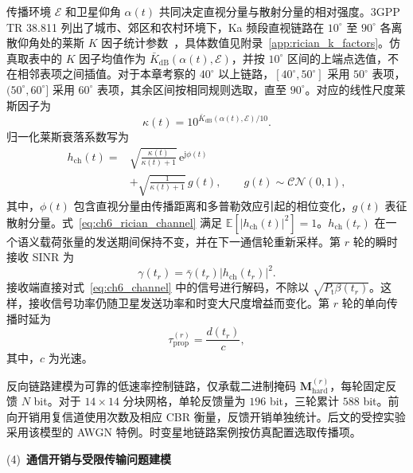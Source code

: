传播环境 $\mathcal E$ 和卫星仰角 $\alpha(t)$ 共同决定直视分量与散射分量的相对强度。3GPP TR 38.811 列出了城市、郊区和农村环境下，Ka 频段直视链路在 $10^\circ$ 至 $90^\circ$ 各离散仰角处的莱斯 $K$ 因子统计参数~\cite{3gpp-38811}，具体数值见附录~\ref{app:rician_k_factors}。仿真取表中的 $K$ 因子均值作为 $\bar K_{\mathrm{dB}}(\alpha(t),\mathcal E)$，并按 $10^\circ$ 区间的上端点选值，不在相邻表项之间插值。对于本章考察的 $40^\circ$ 以上链路，$[40^\circ,50^\circ]$ 采用 $50^\circ$ 表项，$(50^\circ,60^\circ]$ 采用 $60^\circ$ 表项，其余区间按相同规则选取，直至 $90^\circ$。对应的线性尺度莱斯因子为
\begin{equation}\label{eq:ch6_k_factor}
\kappa(t)=10^{\bar K_{\mathrm{dB}}(\alpha(t),\mathcal E)/10}.
\end{equation}
归一化莱斯衰落系数写为
\begin{equation}\label{eq:ch6_rician_channel}
\begin{aligned}
h_{\mathrm{ch}}(t)
={}&\sqrt{\frac{\kappa(t)}{\kappa(t)+1}}\,
\mathrm e^{\mathrm j\phi(t)}\\
&+\sqrt{\frac{1}{\kappa(t)+1}}\,g(t),
\qquad g(t)\sim\mathcal{CN}(0,1),
\end{aligned}
\end{equation}
其中，$\phi(t)$ 包含直视分量由传播距离和多普勒效应引起的相位变化，$g(t)$ 表征散射分量。式~\eqref{eq:ch6_rician_channel} 满足 $\mathbb E[|h_{\mathrm{ch}}(t)|^2]=1$。$h_{\mathrm{ch}}(t_r)$ 在一个语义载荷张量的发送期间保持不变，并在下一通信轮重新采样。第 $r$ 轮的瞬时接收 SINR 为
\begin{equation}\label{eq:ch6_instantaneous_sinr}
\gamma(t_r)=\bar\gamma(t_r)|h_{\mathrm{ch}}(t_r)|^2.
\end{equation}
接收端直接对式~\eqref{eq:ch6_channel} 中的信号进行解码，不除以 $\sqrt{P_{\mathrm t}\beta(t_r)}$。这样，接收信号功率仍随卫星发送功率和时变大尺度增益而变化。第 $r$ 轮的单向传播时延为
\begin{equation}\label{eq:ch6_propagation_delay}
\tau_{\mathrm{prop}}^{(r)}=\frac{d(t_r)}{c},
\end{equation}
其中，$c$ 为光速。

反向链路建模为可靠的低速率控制链路，仅承载二进制掩码 $\mathbf M_{\mathrm{hard}}^{(r)}$，每轮固定反馈 $N$ bit。对于 $14\times14$ 分块网格，单轮反馈量为 $196$ bit，三轮累计 $588$ bit。前向开销用复信道使用次数及相应 CBR 衡量，反馈开销单独统计。后文的受控实验采用该模型的 AWGN 特例。时变星地链路案例按仿真配置选取传播项。

\noindent(4)~\textbf{通信开销与受限传输问题建模}

